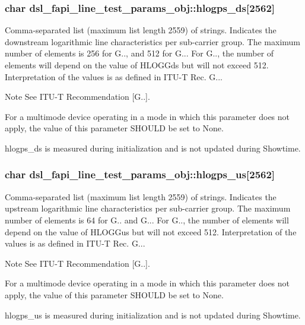 \hypertarget{structdsl__fapi__line__test__params__obj_a5f64a314b926de0db42b37c794f14daf}{
\subsubsection[{hlogps\-\_\-ds}]{\setlength{\rightskip}{0pt plus 5cm}char dsl\-\_\-fapi\-\_\-line\-\_\-test\-\_\-params\-\_\-obj\-::hlogps\-\_\-ds\mbox{[}2562\mbox{]}}}\label{structdsl__fapi__line__test__params__obj_a5f64a314b926de0db42b37c794f14daf}
Comma-\/separated list (maximum list length 2559) of strings. Indicates the downstream logarithmic line characteristics per sub-\/carrier group. The maximum number of elements is 256 for G.., and 512 for G... For G.., the number of elements will depend on the value of H\-L\-O\-G\-Gds but will not exceed 512. Interpretation of the values is as defined in I\-T\-U-\/\-T Rec. G... \begin{DoxyNote}{Note}
See I\-T\-U-\/\-T Recommendation \mbox{[}G..\mbox{]}. 

For a multimode device operating in a mode in which this parameter does not apply, the value of this parameter S\-H\-O\-U\-L\-D be set to None. 

hlogps\-\_\-ds is measured during initialization and is not updated during Showtime. 
\end{DoxyNote}
\hypertarget{structdsl__fapi__line__test__params__obj_a7d6db75c174584b2fdc5ab0e8ee3d499}{
\subsubsection[{hlogps\-\_\-us}]{\setlength{\rightskip}{0pt plus 5cm}char dsl\-\_\-fapi\-\_\-line\-\_\-test\-\_\-params\-\_\-obj\-::hlogps\-\_\-us\mbox{[}2562\mbox{]}}}\label{structdsl__fapi__line__test__params__obj_a7d6db75c174584b2fdc5ab0e8ee3d499}
Comma-\/separated list (maximum list length 2559) of strings. Indicates the upstream logarithmic line characteristics per sub-\/carrier group. The maximum number of elements is 64 for G.. and G... For G.., the number of elements will depend on the value of H\-L\-O\-G\-Gus but will not exceed 512. Interpretation of the values is as defined in I\-T\-U-\/\-T Rec. G... \begin{DoxyNote}{Note}
See I\-T\-U-\/\-T Recommendation \mbox{[}G..\mbox{]}. 

For a multimode device operating in a mode in which this parameter does not apply, the value of this parameter S\-H\-O\-U\-L\-D be set to None. 

hlogps\-\_\-us is measured during initialization and is not updated during Showtime. 
\end{DoxyNote}
